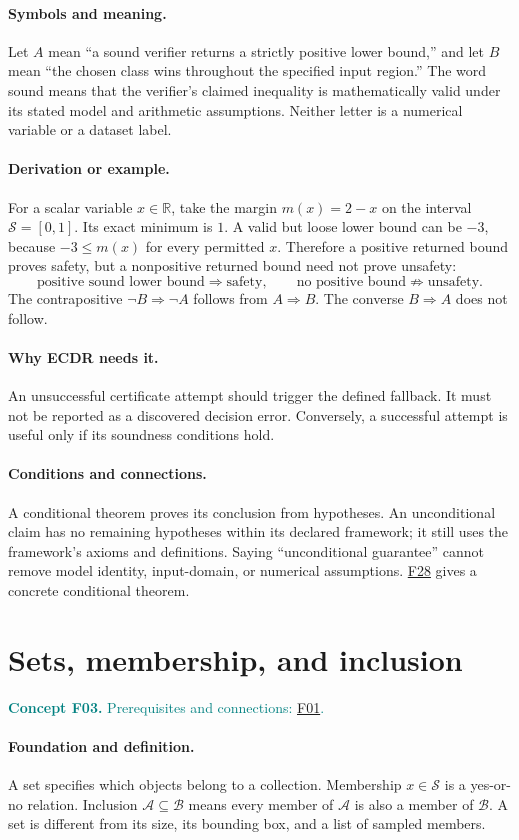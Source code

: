 \documentclass[11pt,a4paper]{article}
\newcommand{\R}{\mathbb R}
\newcommand{\conceptid}{Front matter}
\newcommand{\concept}[3]{\clearpage\renewcommand{\conceptid}{#1}%
\section{#2}\label{concept:#1}%
\textcolor{teal}{\textbf{Concept #1.} Prerequisites and connections: #3.}\par
\typeout{ECDR-CONCEPT-START #1 PAGE=\thepage}}
\begin{document}
\paragraph{Symbols and meaning.}
Let $A$ mean ``a sound verifier returns a strictly positive lower bound,''
and let $B$ mean ``the chosen class wins throughout the specified input
region.'' The word sound means that the verifier's claimed inequality is
mathematically valid under its stated model and arithmetic assumptions.
Neither letter is a numerical variable or a dataset label.
\paragraph{Derivation or example.}
For a scalar variable $x\in\R$, take the margin $m(x)=2-x$ on the
interval $\mathcal S=[0,1]$. Its exact minimum is $1$. A valid but loose
lower bound can be $-3$, because $-3\le m(x)$ for every permitted $x$.
Therefore a positive returned bound proves safety, but a nonpositive
returned bound need not prove unsafety:
\[
 \text{positive sound lower bound}\Rightarrow\text{safety},
 \qquad
 \text{no positive bound}\not\Rightarrow\text{unsafety}.
\]
The contrapositive $\neg B\Rightarrow\neg A$ follows from
$A\Rightarrow B$. The converse $B\Rightarrow A$ does not follow.
\paragraph{Why ECDR needs it.}
An unsuccessful certificate attempt should trigger the defined fallback.
It must not be reported as a discovered decision error. Conversely, a
successful attempt is useful only if its soundness conditions hold.
\paragraph{Conditions and connections.}
A conditional theorem proves its conclusion from hypotheses. An
unconditional claim has no remaining hypotheses within its declared
framework; it still uses the framework's axioms and definitions. Saying
``unconditional guarantee'' cannot remove model identity, input-domain,
or numerical assumptions. \hyperref[concept:F28]{F28} gives a concrete conditional theorem.
\par\label{endconcept:F02}

\concept{F03}{Sets, membership, and inclusion}{\hyperref[concept:F01]{F01}}
\paragraph{Foundation and definition.}
A set specifies which objects belong to a collection. Membership
$x\in\mathcal S$ is a yes-or-no relation. Inclusion
$\mathcal A\subseteq\mathcal B$ means every member of $\mathcal A$ is
also a member of $\mathcal B$. A set is different from its size, its
bounding box, and a list of sampled members.
\end{document}
